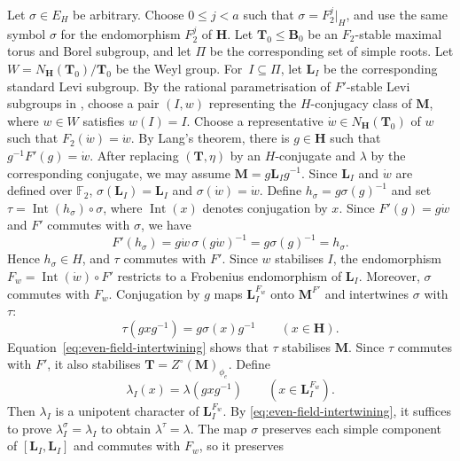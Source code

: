 \documentclass[10pt]{amsart}
\theoremstyle{definition}
\renewcommand{\leq}{\leqslant}
\let\oldendproof\endproof
\renewenvironment{proof}[1][\proofname]{%
  \oldproof[\bfseries #1]%
}{\oldendproof}
\newcommand{\F}{\mathbb F}
\numberwithin{equation}{section}
\numberwithin{table}{section}
\begin{document}
\begin{proof}
  Let $\sigma\in E_H$ be arbitrary. Choose $0\leq j<a$ such that
  $\sigma=F_2^j|_H$, and use the same symbol $\sigma$ for the
  endomorphism $F_2^j$ of $\mathbf H$. Let
  $\mathbf T_0\leq\mathbf B_0$ be an $F_2$-stable maximal torus and Borel
  subgroup, and let $\Pi$ be the corresponding set of simple roots.
  Let $W=N_{\mathbf H}(\mathbf T_0)/\mathbf T_0$ be the Weyl group.
  For~$I\subseteq\Pi$, let $\mathbf L_I$ be the corresponding standard
  Levi subgroup.  By the rational parametrisation of $F'$-stable Levi
  subgroups in \cite[Section~2.3]{CabanesSpath2013}, choose a pair
  $(I,w)$ representing the $H$-conjugacy class of $\mathbf M$, where
  $w\in W$ satisfies $w(I)=I$.  Choose a representative
  $\dot w\in N_{\mathbf H}(\mathbf T_0)$ of $w$ such that
  $F_2(\dot w)=\dot w$.  By Lang's theorem, there is $g\in\mathbf H$ such that
  $g^{-1}F'(g)=\dot w$.
  After replacing $(\mathbf T,\eta)$ by an $H$-conjugate and $\lambda$ by
  the corresponding conjugate, we may assume $\mathbf M=g\mathbf L_Ig^{-1}$.
  Since $\mathbf L_I$ and $\dot w$ are
  defined over $\F_2$,
  $\sigma(\mathbf L_I)=\mathbf L_I$ and
  $\sigma(\dot w)=\dot w$.  Define $h_\sigma=g\sigma(g)^{-1}$ and set
  $\tau=\operatorname{Int}(h_\sigma)\circ\sigma$, where
  $\operatorname{Int}(x)$ denotes conjugation by $x$.
  Since $F'(g)=g\dot w$ and $F'$ commutes with $\sigma$, we have
  \[
       F'(h_\sigma)
       =g\dot w\,\sigma(g\dot w)^{-1}
       =g\sigma(g)^{-1}=h_\sigma.
  \]
  Hence $h_\sigma\in H$, and $\tau$ commutes with $F'$.  Since $w$
  stabilises $I$, the endomorphism
  $F_w=\operatorname{Int}(\dot w)\circ F'$ restricts to a Frobenius
  endomorphism of $\mathbf L_I$.  Moreover, $\sigma$ commutes with $F_w$.
  Conjugation by $g$
  maps $\mathbf L_I^{F_w}$ onto $\mathbf M^{F'}$ and intertwines $\sigma$
  with $\tau$:
  \begin{equation}\label{eq:even-field-intertwining}
       \tau(gxg^{-1})=g\sigma(x)g^{-1}\qquad(x\in\mathbf H).
  \end{equation}
Equation~\eqref{eq:even-field-intertwining} shows that $\tau$ stabilises $\mathbf M$.
Since $\tau$ commutes with $F'$, it also stabilises
$\mathbf T=Z^\circ(\mathbf M)_{\phi_e}$.
Define
\[
  \lambda_I(x)=\lambda(gxg^{-1})
  \qquad(x\in\mathbf L_I^{F_w}).
\]
Then $\lambda_I$ is a unipotent character of $\mathbf L_I^{F_w}$.
By \eqref{eq:even-field-intertwining}, it suffices to prove
$\lambda_I^\sigma=\lambda_I$ to obtain $\lambda^\tau=\lambda$.
The map $\sigma$ preserves each simple component of
$[\mathbf L_I,\mathbf L_I]$ and commutes with $F_w$, so it preserves

\end{proof}
\end{document}
